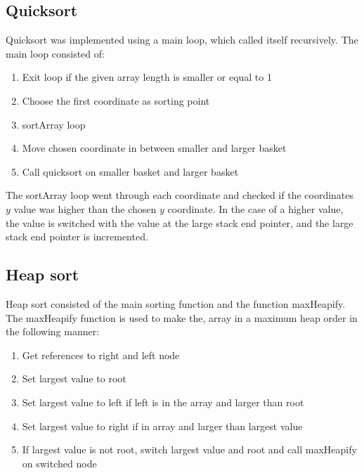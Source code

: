 \documentclass[12pt, a4paper]{article}
\begin{document}
		\subsection{Quicksort}
			Quicksort was implemented using a main loop, which called itself recursively. The main loop consisted of:
			\begin{enumerate}
				\addtolength\itemsep{-2mm}
				\item Exit loop if the given array length is smaller or equal to 1
				\item Choose the first coordinate as sorting point
				\item sortArray loop
				\item Move chosen coordinate in between smaller and larger basket
				\item Call quicksort on smaller basket and larger basket
			\end{enumerate}
			The sortArray loop went through each coordinate and checked if the coordinates $y$ value was higher than the chosen $y$ coordinate. In the case of a higher value, the value is switched with the value at the large stack end pointer, and the large stack end pointer is incremented. 
		\subsection{Heap sort}
			Heap sort consisted of the main sorting function and the function maxHeapify.\\	
			The maxHeapify function is used to make the, array in a maximum heap order in the following manner:
			\begin{enumerate}
				\addtolength\itemsep{-2mm}
				\item Get references to right and left node
				\item Set largest value to root
				\item Set largest value to left if left is in the array and larger than root
				\item Set largest value to right if in array and larger than largest value
				\item If largest value is not root, switch largest value and root and call maxHeapify on switched node
			\end{enumerate}
\end{document}
